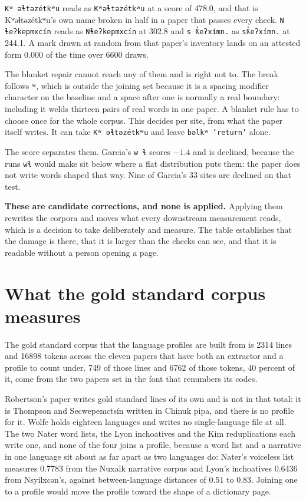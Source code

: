 \texttt{Kʷ əɬtəzétkʷu} reads as \texttt{Kʷəɬtəzétkʷu} at a score of 478.0, and that is Kʷəɬtəzétkʷu's own name broken in half in a paper that passes every check. \texttt{N ɬeʔkepmxcín} reads as \texttt{Nɬeʔkepmxcín} at 302.8 and \texttt{s ƛ̓eʔxímn.} as \texttt{sƛ̓eʔxímn.} at 244.1. A mark drawn at random from that paper's inventory lands on an attested form 0.000 of the time over 6600 draws.

The blanket repair cannot reach any of them and is right not to. The break follows \texttt{ʷ}, which is outside the joining set because it is a spacing modifier character on the baseline and a space after one is normally a real boundary: including it welds thirteen pairs of real words in one paper. A blanket rule has to choose once for the whole corpus. This decides per site, from what the paper itself writes. It can take \texttt{Kʷ əɬtəzétkʷu} and leave \texttt{bəlkʷ `return'} alone.

The score separates them. Garcia's \texttt{w ɬ} scores $-1.4$ and is declined, because the runs \texttt{wɬ} would make sit below where a flat distribution puts them: the paper does not write words shaped that way. Nine of Garcia's 33 sites are declined on that test.

\textbf{These are candidate corrections, and none is applied.} Applying them rewrites the corpora and moves what every downstream measurement reads, which is a decision to take deliberately and measure. The table establishes that the damage is there, that it is larger than the checks can see, and that it is readable without a person opening a page.

\section{What the gold standard corpus measures}

The gold standard corpus that the language profiles are built from is 2314 lines and 16898 tokens across the eleven papers that have both an extractor and a profile to count under. 749 of those lines and 6762 of those tokens, 40 percent of it, come from the two papers set in the font that renumbers its codes.

Robertson's paper writes gold standard lines of its own and is not in that total: it is Thompson and Secwepemctsín written in Chinuk pipa, and there is no profile for it. Wolfe holds eighteen languages and writes no single-language file at all. The two Nater word lists, the Lyon inchoatives and the Kim reduplications each write one, and none of the four joins a profile, because a word list and a narrative in one language sit about as far apart as two languages do: Nater's voiceless list measures 0.7783 from the Nuxalk narrative corpus and Lyon's inchoatives 0.6436 from Nsyilxcən's, against between-language distances of 0.51 to 0.83. Joining one to a profile would move the profile toward the shape of a dictionary page.

